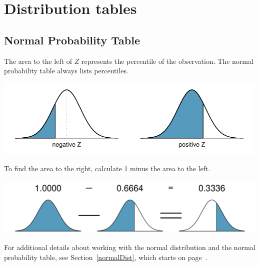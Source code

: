 \singlespacing

\chapter{Distribution tables}
\label{distributionTables}

\section{Normal Probability Table}
\label{normalProbabilityTable}

The area to the left of $Z$ represents the percentile of the observation. The normal probability table always lists percentiles.
\begin{center}
\includegraphics[height=1.5in]{extraTeX/appendix/figures/normalTails/normalTails}
\end{center}
To find the area to the right, calculate 1 minus the area to the left.\vspace{1mm}
\begin{center}
\includegraphics[height=1.1in]{extraTeX/appendix/figures/normalTails/subtractingArea/subtractingArea}\vspace{3mm}
\end{center}
For additional details about working with the normal distribution and the normal probability table, see Section~\ref{normalDist}, which starts on page~\pageref{normalDist}.

